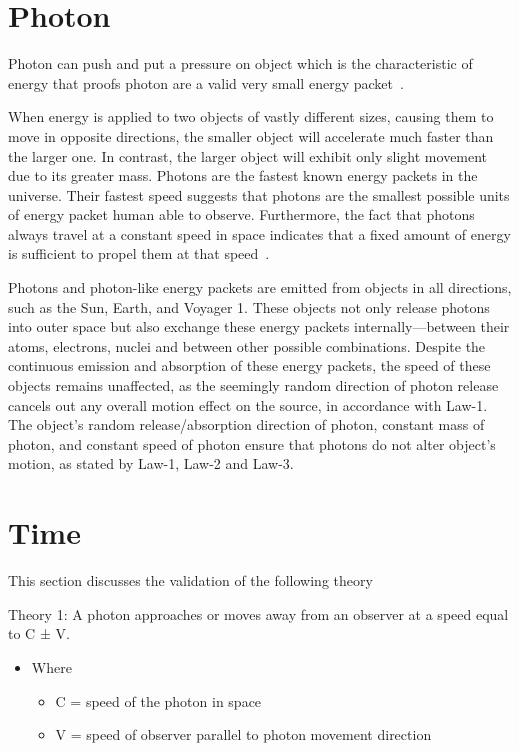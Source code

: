 \documentclass{article}
\begin{document}
    \section{Photon}\label{sec:photon}
    Photon can push and put a pressure on object which is the characteristic of energy that proofs photon are a valid very small energy packet~\cite{einstein1905electrodynamics}.

    When energy is applied to two objects of vastly different sizes, causing them to move in opposite directions, the smaller object will accelerate much faster than the larger one.
    In contrast, the larger object will exhibit only slight movement due to its greater mass.
    Photons are the fastest known energy packets in the universe.
    Their fastest speed suggests that photons are the smallest possible units of energy packet human able to observe.
    Furthermore, the fact that photons always travel at a constant speed in space indicates that a fixed amount of energy is sufficient to propel them at that speed~\cite{einstein1905electrodynamics}.

    Photons and photon-like energy packets are emitted from objects in all directions, such as the Sun, Earth, and Voyager 1.
    These objects not only release photons into outer space but also exchange these energy packets internally—between their atoms, electrons, nuclei and between other possible combinations.
    Despite the continuous emission and absorption of these energy packets, the speed of these objects remains unaffected, as the seemingly random direction of photon release cancels out any overall motion effect on the source, in accordance with Law-1.
    The object’s random release/absorption direction of photon, constant mass of photon, and constant speed of photon  ensure that photons do not alter object’s motion, as stated by Law-1, Law-2 and Law-3.

    \section{Time}\label{sec:time}
    This section discusses the validation of the following theory

    \begin{tcolorbox}[colback=white, colframe=black, boxrule=1mm, arc=4mm, auto outer arc]
        Theory 1: A photon approaches or moves away from an observer at a speed equal to C ± V.
        \begin{itemize}
            \item Where
            \begin{itemize}
                \item C = speed of the photon in space
                \item V = speed of observer parallel to photon movement direction
            \end{itemize}
        \end{itemize}
    \end{tcolorbox}
\end{document}
